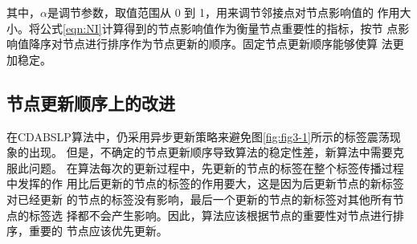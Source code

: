 其中，$\alpha$是调节参数，取值范围从 0 到 1，用来调节邻接点对节点影响值的
作用大小。将公式\ref{eqn:NI}计算得到的节点影响值作为衡量节点重要性的指标，按节
点影响值降序对节点进行排序作为节点更新的顺序。固定节点更新顺序能够使算
法更加稳定。 





\subsection{节点更新顺序上的改进}
在CDABSLP算法中，仍采用异步更新策略来避免图\ref{fig:fig3-1}所示的标签震荡现象的出现。
但是，不确定的节点更新顺序导致算法的稳定性差，新算法中需要克服此问题。
在算法每次的更新过程中，先更新的节点的标签在整个标签传播过程中发挥的作
用比后更新的节点的标签的作用要大，这是因为后更新节点的新标签对已经更新
的节点的标签没有影响，最后一个更新的节点的新标签对其他所有节点的标签选
择都不会产生影响。因此，算法应该根据节点的重要性对节点进行排序，重要的
节点应该优先更新。 

